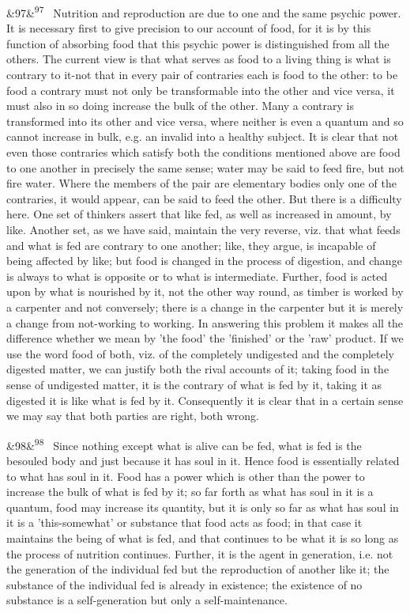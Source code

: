 \documentclass[12pt]{article}
\newcommand{\para}[1][]{\par\noindent\ifx&#1&\else\textsuperscript{\footnotesize #1}~\fi}
\begin{document}
\para[97] Nutrition and reproduction are due to one and the same psychic power. It is necessary first to give precision to our account of food, for it is by this function of absorbing food that this psychic power is distinguished from all the others. The current view is that what serves as food to a living thing is what is contrary to it-not that in every pair of contraries each is food to the other: to be food a contrary must not only be transformable into the other and vice versa, it must also in so doing increase the bulk of the other. Many a contrary is transformed into its other and vice versa, where neither is even a quantum and so cannot increase in bulk, e.g. an invalid into a healthy subject. It is clear that not even those contraries which satisfy both the conditions mentioned above are food to one another in precisely the same sense; water may be said to feed fire, but not fire water. Where the members of the pair are elementary bodies only one of the contraries, it would appear, can be said to feed the other. But there is a difficulty here. One set of thinkers assert that like fed, as well as increased in amount, by like. Another set, as we have said, maintain the very reverse, viz. that what feeds and what is fed are contrary to one another; like, they argue, is incapable of being affected by like; but food is changed in the process of digestion, and change is always to what is opposite or to what is intermediate. Further, food is acted upon by what is nourished by it, not the other way round, as timber is worked by a carpenter and not conversely; there is a change in the carpenter but it is merely a change from not-working to working. In answering this problem it makes all the difference whether we mean by 'the food' the 'finished' or the 'raw' product. If we use the word food of both, viz. of the completely undigested and the completely digested matter, we can justify both the rival accounts of it; taking food in the sense of undigested matter, it is the contrary of what is fed by it, taking it as digested it is like what is fed by it. Consequently it is clear that in a certain sense we may say that both parties are right, both wrong.

\para[98] Since nothing except what is alive can be fed, what is fed is the besouled body and just because it has soul in it. Hence food is essentially related to what has soul in it. Food has a power which is other than the power to increase the bulk of what is fed by it; so far forth as what has soul in it is a quantum, food may increase its quantity, but it is only so far as what has soul in it is a 'this-somewhat' or substance that food acts as food; in that case it maintains the being of what is fed, and that continues to be what it is so long as the process of nutrition continues. Further, it is the agent in generation, i.e. not the generation of the individual fed but the reproduction of another like it; the substance of the individual fed is already in existence; the existence of no substance is a self-generation but only a self-maintenance.
\end{document}
